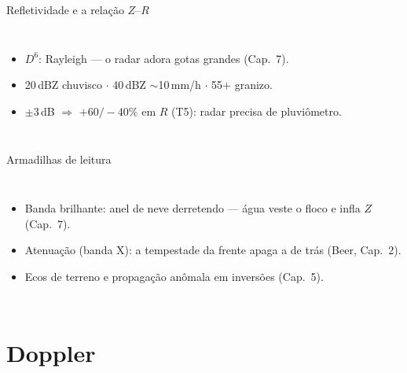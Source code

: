 \documentclass[aspectratio=169,11pt]{beamer}
\begin{document}
\begin{frame}{Refletividade e a relação $Z$--$R$}
  \begin{columns}
    \vspace{0.4em}
    \begin{itemize}
      \item $D^6$: Rayleigh — o radar adora gotas grandes (Cap.~7).
      \item 20\,dBZ chuvisco $\cdot$ 40\,dBZ $\sim$10\,mm/h $\cdot$
            55$+$ granizo.
      \item $\pm3$\,dB $\Rightarrow$ $+60/-40\%$ em $R$ (T5): radar
            precisa de pluviômetro.
    \end{itemize}
  \end{columns}
\end{frame}

\begin{frame}{Armadilhas de leitura}
  \begin{columns}
    \begin{itemize}
      \item \alert{Banda brilhante}: anel de neve derretendo — água
            veste o floco e infla $Z$ (Cap.~7).
      \item Atenuação (banda X): a tempestade da frente apaga a de
            trás (Beer, Cap.~2).
      \item Ecos de terreno e propagação anômala em inversões
            (Cap.~5).
    \end{itemize}
  \end{columns}
\end{frame}

\section{Doppler}
\end{document}
